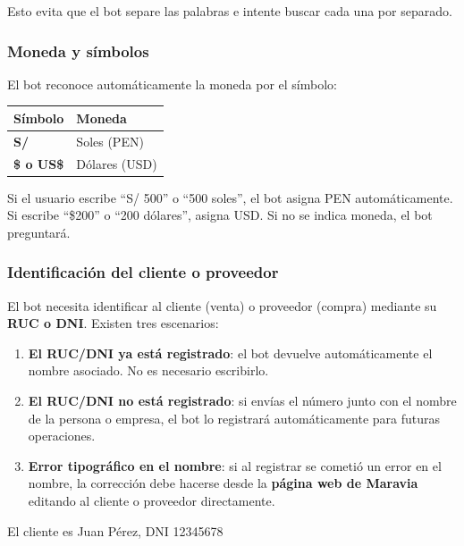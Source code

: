 \documentclass[12pt,a4paper]{article}
\begin{document}
Esto evita que el bot separe las palabras e intente buscar cada una por separado.

\subsubsection{Moneda y s\'imbolos}

El bot reconoce autom\'aticamente la moneda por el s\'imbolo:

\begin{center}
\begin{tabular}{>{\bfseries}l l}
\toprule
S\'imbolo & Moneda \\
\midrule
S/ & Soles (PEN) \\
\$ o US\$ & D\'olares (USD) \\
\bottomrule
\end{tabular}
\end{center}

Si el usuario escribe ``S/ 500'' o ``500 soles'', el bot asigna PEN autom\'aticamente. Si escribe ``\$200'' o ``200 d\'olares'', asigna USD. Si no se indica moneda, el bot preguntar\'a.

\subsubsection{Identificaci\'on del cliente o proveedor}

El bot necesita identificar al cliente (venta) o proveedor (compra) mediante su \textbf{RUC o DNI}. Existen tres escenarios:

\begin{enumerate}
    \item \textbf{El RUC/DNI ya est\'a registrado}: el bot devuelve autom\'aticamente el nombre asociado. No es necesario escribirlo.

    \item \textbf{El RUC/DNI no est\'a registrado}: si env\'ias el n\'umero junto con el nombre de la persona o empresa, el bot lo registrar\'a autom\'aticamente para futuras operaciones.

    \item \textbf{Error tipogr\'afico en el nombre}: si al registrar se cometi\'o un error en el nombre, la correcci\'on debe hacerse desde la \textbf{p\'agina web de Maravia} editando al cliente o proveedor directamente.
\end{enumerate}

\begin{mensajeusuario}
El cliente es Juan P\'erez, DNI 12345678
\end{mensajeusuario}
\end{document}

